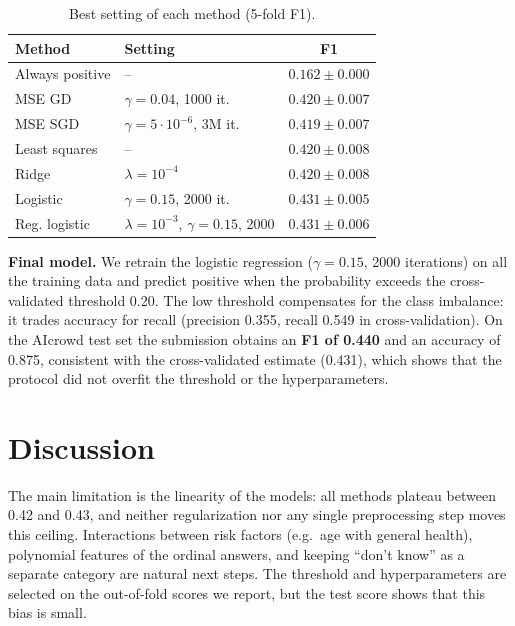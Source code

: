 \documentclass[10pt,conference,compsocconf]{IEEEtran}
\begin{document}
\begin{table}[htbp]
  \centering
  \caption{Best setting of each method (5-fold F1).}
  \label{tab:models}
  \small\setlength{\tabcolsep}{4pt}
  \begin{tabular}{llc}
    \toprule
    Method & Setting & F1 \\
    \midrule
    Always positive & -- & $0.162 \pm 0.000$ \\
    MSE GD & $\gamma = 0.04$, 1000 it. & $0.420 \pm 0.007$ \\
    MSE SGD & $\gamma = 5\cdot10^{-6}$, 3M it. & $0.419 \pm 0.007$ \\
    Least squares & -- & $0.420 \pm 0.008$ \\
    Ridge & $\lambda = 10^{-4}$ & $0.420 \pm 0.008$ \\
    Logistic & $\gamma = 0.15$, 2000 it. & $\mathbf{0.431 \pm 0.005}$ \\
    Reg. logistic & $\lambda{=}10^{-3}$, $\gamma{=}0.15$, 2000 & $0.431 \pm 0.006$ \\
    \bottomrule
  \end{tabular}
\end{table}

\textbf{Final model.} We retrain the logistic regression ($\gamma = 0.15$,
2000 iterations) on all the training data and predict positive when the
probability exceeds the cross-validated threshold 0.20. The low threshold
compensates for the class imbalance: it trades accuracy for recall
(precision 0.355, recall 0.549 in cross-validation). On the AIcrowd test set
the submission obtains an \textbf{F1 of 0.440} and an accuracy of 0.875,
consistent with the cross-validated estimate (0.431), which shows that the
protocol did not overfit the threshold or the hyperparameters.

\section{Discussion}

The main limitation is the linearity of the models: all methods plateau
between 0.42 and 0.43, and neither regularization nor any single
preprocessing step moves this ceiling. Interactions between risk factors
(e.g.\ age with general health), polynomial features of the ordinal answers,
and keeping ``don't know'' as a separate category are natural next steps.
The threshold and hyperparameters are selected on the out-of-fold scores we
report, but the test score shows that this bias is small.
\end{document}

